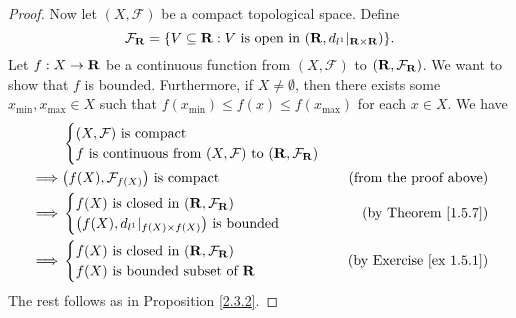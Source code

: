 \begin{proof}
    Now let \((X, \mathcal{F})\) be a compact topological space.
    Define
    \[
        \mathcal{F}_{\mathbf{R}} = \{V \subseteq \mathbf{R} : V \text{ is open in } (\mathbf{R}, d_{l^1}|_{\mathbf{R} \times \mathbf{R}})\}.
    \]
    Let \(f : X \to \mathbf{R}\) be a continuous function from \((X, \mathcal{F})\) to \((\mathbf{R}, \mathcal{F}_{\mathbf{R}})\).
    We want to show that \(f\) is bounded.
    Furthermore, if \(X \neq \emptyset\), then there exists some \(x_{\min}, x_{\max} \in X\) such that \(f(x_{\min}) \leq f(x) \leq f(x_{\max})\) for each \(x \in X\).
    We have
    \begin{align*}
                 & \begin{cases}
                       (X, \mathcal{F}) \text{ is compact} \\
                       f \text{ is continuous from } (X, \mathcal{F}) \text{ to } (\mathbf{R}, \mathcal{F}_{\mathbf{R}})
                   \end{cases}                                  \\
        \implies & \big(f(X), \mathcal{F}_{f(X)}\big) \text{ is compact}                             & \text{(from the proof above)} \\
        \implies & \begin{cases}
                       f(X) \text{ is closed in } (\mathbf{R}, \mathcal{F}_{\mathbf{R}}) \\
                       \big(f(X), d_{l^1}|_{f(X) \times f(X)}\big) \text{ is bounded}
                   \end{cases}                    & \text{(by Theorem \ref{1.5.7})}                                                  \\
        \implies & \begin{cases}
                       f(X) \text{ is closed in } (\mathbf{R}, \mathcal{F}_{\mathbf{R}}) \\
                       f(X) \text{ is bounded subset of } \mathbf{R}
                   \end{cases}                              & \text{(by Exercise \ref{ex 1.5.1})}
    \end{align*}
    The rest follows as in Proposition \ref{2.3.2}.
\end{proof}